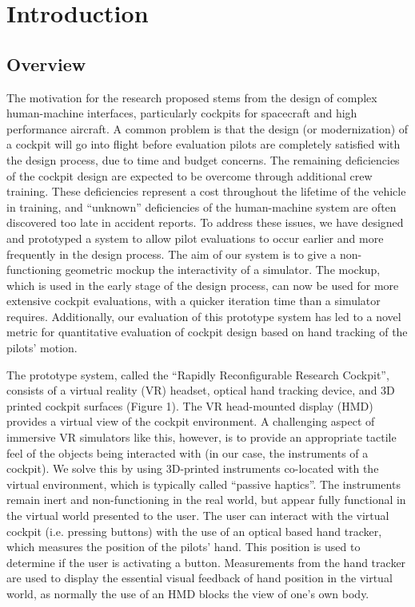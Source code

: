 \chapter{Introduction}

\section{Overview}
\label{overview}

The motivation for the research proposed stems from the design of complex human-machine interfaces, particularly cockpits for spacecraft and high performance aircraft. A common problem is that the design (or modernization) of a cockpit will go into flight before evaluation pilots are completely satisfied with the design process, due to time and budget concerns. The remaining deficiencies of the cockpit design are expected to be overcome through additional crew training. These deficiencies represent a cost throughout the lifetime of the vehicle in training, and ``unknown'' deficiencies of the human-machine system are often discovered too late in accident reports. To address these issues, we have designed and prototyped a system to allow pilot evaluations to occur earlier and more frequently in the design process. The aim of our system is to give a non-functioning geometric mockup the interactivity of a simulator. The mockup, which is used in the early stage of the design process, can now be used for more extensive cockpit evaluations, with a quicker iteration time than a simulator requires. Additionally, our evaluation of this prototype system has led to a novel metric for quantitative evaluation of cockpit design based on hand tracking of the pilots' motion.

The prototype system, called the ``Rapidly Reconfigurable Research Cockpit'', consists of a virtual reality (VR) headset, optical hand tracking device, and 3D printed cockpit surfaces (Figure 1). The VR head-mounted display (HMD) provides a virtual view of the cockpit environment. A challenging aspect of immersive VR simulators like this, however, is to provide an appropriate tactile feel of the objects being interacted with (in our case, the instruments of a cockpit). We solve this by using 3D-printed instruments co-located with the virtual environment, which is typically called ``passive haptics''. The instruments remain inert and non-functioning in the real world, but appear fully functional in the virtual world presented to the user. The user can interact with the virtual cockpit (i.e. pressing buttons) with the use of an optical based hand tracker, which measures the position of the pilots' hand. This position is used to determine if the user is activating a button. Measurements from the hand tracker are used to display the essential visual feedback of hand position in the virtual world, as normally the use of an HMD blocks the view of one's own body.

